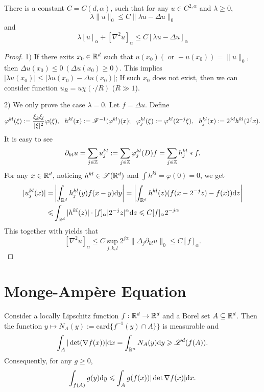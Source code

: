 \begin{lemma}\label{lem:schauder}
    There is a constant $C=C(d, \alpha)$, such that for any $u\in C^{2,\alpha}$ and \(\lambda \geq 0\), 
    \begin{equation}
        \lambda \|u\|_0\leq C \|\lambda u-\Delta u\|_0
    \end{equation}
    and 
    \begin{equation}
        \lambda [u]_\alpha+[\nabla^2 u]_\alpha \leq C [\lambda u- \Delta u]_\alpha
    \end{equation}
\end{lemma}
\begin{proof}
    1) If there exits \(x_0\in {\mathbb R}^d\) such that \(u(x_0) ( \mbox{ or }-u(x_0))=\|u\|_0\), then \(\Delta u(x_0) \leq 0~ (\Delta u(x_0)\geq 0)\). This implies 
    \(|\lambda u(x_0)|\leq |\lambda u(x_0)-\Delta u(x_0)|\); If such \(x_0\) does not exist, then we can consider function \(u_R= u \chi(\cdot/R)\) (\(R\gg 1\)). 
    
    2) We only prove the case \(\lambda=0\). Let \(f=\Delta u\). Define 
    $$
        \varphi^{kl} (\xi):= \frac{\xi_k\xi_l}{|\xi|^2} \varphi (\xi),\ \  h^{kl}(x):=\sF^{-1}(\varphi^{kl})(x);  \ \ \varphi^{kl}_j (\xi):= \varphi^{kl}(2^{-j}\xi), \ \ h^{kl}_j(x):=2^{jd} h^{kl}(2^jx). 
    $$
    It is easy to see
    $$
        \partial_{kl}u=\sum_{j\in {\mathbb Z}} u^{kl}_j:=\sum_{j\in {\mathbb Z}}\varphi^{kl}_j (D) f=\sum_{j\in {\mathbb Z}} h^{kl}_j* f.  
    $$
    For any $x\in {\mathbb R}^d$, noticing $h^{kl}\in {\mathscr S}({\mathbb R}^d)$ and $\int h^{kl}=\varphi (0)=0$, we get 
    \begin{align*}
        |u^{kl}_j(x)|=&\left|\int_{{\mathbb R}^d} h^{kl}_j (y)f(x-y) \text{\rm{d}} y\right|=\left|\int_{{\mathbb R}^d} h^{kl} (z)(f(x-2^{-j}z)-f(x)) \text{\rm{d}} z\right| \\
        \leqslant&  \int_{{\mathbb R}^d} |h^{kl}(z)| \cdot [f]_\alpha |2^{-j}z|^\alpha  \text{\rm{d}} z\leqslant C [f]_\alpha 2^{-j\alpha}
    \end{align*}
    This together with  yields that  
    \[
        [\nabla^2 u]_\alpha \leq C\sup_{j,k,l}2^{j\alpha}\|\Delta_j \partial_{kl}u\|_0 \leq C [f]_\alpha. 
    \]
\end{proof}


\section{Monge-Ampère Equation}\label{app:MAE}

\begin{lemma}
    Consider a locally Lipschitz function $f: {\mathbb R}^d \to {\mathbb R}^d$ and a Borel set $A\subseteq {\mathbb R}^d$. Then the function $y\mapsto N_A(y):= \mathrm{card}\{f^{-1}(y)\cap A\}\}$ is measurable and 
    \begin{equation*}
        \int_{A} |\det (\nabla f(x))| \text{\rm{d}} x = \int_{{\mathbb R}^n} N_A(y) \text{\rm{d}} y \geqslant {\mathscr L}^d(f(A)). 
    \end{equation*}
    Consequently, for any $g\geq 0$, 
    \begin{equation}\label{eq:area}
        \int_{f(A)}g(y)\text{\rm{d}} y\leqslant \int_{A} g(f(x)) |\det \nabla f(x)|\text{\rm{d}} x. 
    \end{equation}
\end{lemma}
        
